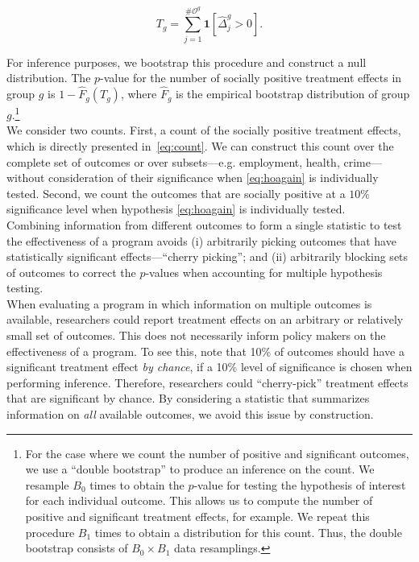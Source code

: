 \begin{equation}
T_{g} = \sum _{j=1}^{\# \mathcal{O}^g} \mathbf{1} \left[ \widehat{\Delta}_{j}^{g} > 0\right]. \label{eq:count}
\end{equation} 

\noindent For inference purposes, we bootstrap this procedure and construct a null distribution. The $p$-value for the number of socially positive treatment effects in group $g$ is $1 - \widehat{F}_{g} \left( T_{g} \right)$, where $ \widehat{F}_{g}$ is the empirical bootstrap distribution of group $g$.\footnote{For the case where we count the number of positive and significant outcomes, we use a ``double bootstrap'' to produce an inference on the count. We resample $B_{0}$ times to obtain the $p$-value for testing the hypothesis of interest for each individual outcome. This allows us to compute the number of positive and significant treatment effects, for example. We repeat this procedure $B_{1}$ times to obtain a distribution for this count. Thus, the double bootstrap consists of $B_{0} \times B_{1}$ data resamplings.}\\

\noindent We consider two counts. First, a count of the socially positive treatment effects, which is directly presented in~\eqref{eq:count}. We can construct this count over the complete set of outcomes or over subsets---e.g. employment, health, crime---without consideration of their significance when \eqref{eq:hoagain} is individually tested. Second, we count the outcomes that are  socially positive at a $10\%$ significance level when hypothesis \eqref{eq:hoagain} is individually tested.\\

\noindent Combining information from different outcomes to form a single statistic to test the effectiveness of a program avoids (i) arbitrarily picking outcomes that have statistically significant effects---``cherry picking''; and (ii) arbitrarily blocking sets of outcomes to correct the $p$-values when accounting for multiple hypothesis testing.\\

\noindent When evaluating a program in which information on multiple outcomes is available, researchers could report treatment effects on an arbitrary or relatively small set of outcomes. This does not necessarily inform policy makers on the effectiveness of a program. To see this, note that 10\% of outcomes should have a significant treatment effect \textit{by chance}, if a 10\% level of significance is chosen when performing inference. Therefore, researchers could ``cherry-pick'' treatment effects that are significant by chance. By considering a statistic that summarizes information on \emph{all} available outcomes, we avoid this issue by construction.\\

